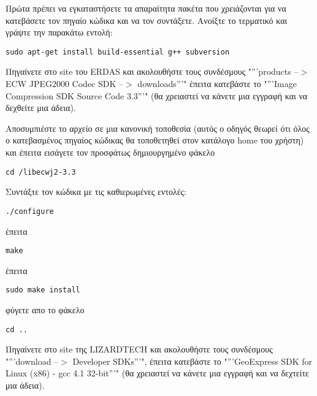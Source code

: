 Πρώτα πρέπει να εγκαταστήσετε τα απαραίτητα πακέτα που χρειάζονται για να κατεβάσετε τον πηγαίο κώδικα και να τον συντάξετε. Ανοίξτε το τερματικό και γράψτε την παρακάτω εντολή:

\begin{verbatim}
sudo apt-get install build-essential g++ subversion
\end{verbatim}

Πηγαίνετε στο site του ERDAS  και ακολουθήστε τους συνδέσμους
"'''products --$>$ ECW JPEG2000 Codec SDK --$>$ downloads'''" 
έπειτα κατεβάστε το "'''Image Compression SDK Source Code 3.3'''" (θα χρειαστεί να κάνετε μια εγγραφή και να δεχθείτε μια άδεια).

Αποσυμπιέστε το αρχείο σε μια κανονική τοποθεσία (αυτός ο οδηγός θεωρεί ότι όλος ο κατεβασμένος πηγαίος κώδικας θα τοποθετηθεί στον κατάλογο home του χρήστη) και έπειτα εισάγετε τον προσφάτως δημιουργημένο φάκελο 

\begin{verbatim}
cd /libecwj2-3.3
\end{verbatim}

Συντάξτε τον κώδικα με τις καθιερωμένες εντολές: 

\begin{verbatim}
./configure
\end{verbatim}

έπειτα

\begin{verbatim}
make
\end{verbatim}

έπειτα

\begin{verbatim}
sudo make install
\end{verbatim}

φύγετε απο το φάκελο  

\begin{verbatim}
cd ..
\end{verbatim}

Πηγαίνετε στο site της LIZARDTECH  και ακολουθήστε τους συνδέσμους
"'''download --$>$ Developer SDKs'''", 
έπειτα κατεβάστε το "'''GeoExpress SDK for Linux (x86) - gcc 4.1 32-bit'''"
(θα χρειαστεί να κάνετε μια εγγραφή και να δεχτείτε μια άδεια).

